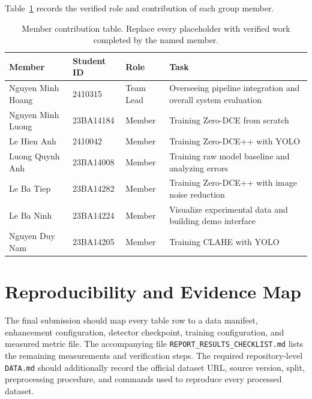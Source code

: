 \documentclass[11pt,a4paper]{article}
\newcommand{\TeamLeadName}{Nguyen Minh Hoang}
\newcommand{\TeamLeadID}{2410315}
\newcommand{\MemberTwoName}{Nguyen Minh Luong}
\newcommand{\MemberTwoID}{23BA14184}
\newcommand{\MemberThreeName}{Le Hien Anh}
\newcommand{\MemberThreeID}{2410042}
\newcommand{\MemberFourName}{Luong Quynh Anh}
\newcommand{\MemberFourID}{23BA14008}
\newcommand{\MemberFiveName}{Le Ba Tiep}
\newcommand{\MemberFiveID}{23BA14282}
\newcommand{\MemberSixName}{Le Ba Ninh}
\newcommand{\MemberSixID}{23BA14224}
\newcommand{\MemberSevenName}{Nguyen Duy Nam}
\newcommand{\MemberSevenID}{23BA14205}
\begin{document}
Table~\ref{tab:member-contributions} records the verified role and contribution
of each group member.

\begin{table}[H]
\centering
\caption{Member contribution table. Replace every placeholder with verified
work completed by the named member.}
\label{tab:member-contributions}
\small
\begin{tabularx}{\textwidth}{lll>{\raggedright\arraybackslash}X}
\toprule
Member & Student ID & Role & Task \\
\midrule
\TeamLeadName & \TeamLeadID & Team Lead & Overseeing pipeline integration and overall system evaluation\\
\MemberTwoName & \MemberTwoID & Member & Training Zero-DCE from scratch \\
\MemberThreeName & \MemberThreeID & Member & Training Zero-DCE++ with YOLO \\
\MemberFourName & \MemberFourID & Member & Training raw model baseline and analyzing errors  \\
\MemberFiveName & \MemberFiveID & Member & Training Zero-DCE++ with image noise reduction  \\
\MemberSixName & \MemberSixID & Member & Visualize experimental data and building demo interface\\
\MemberSevenName & \MemberSevenID & Member & Training CLAHE with YOLO \\

\bottomrule
\end{tabularx}
\end{table}

\section{Reproducibility and Evidence Map}

The final submission should map every table row to a data manifest, enhancement
configuration, detector checkpoint, training configuration, and measured metric
file. The accompanying file \texttt{REPORT\_RESULTS\_CHECKLIST.md} lists the
remaining measurements and verification steps. The required repository-level
\texttt{DATA.md} should additionally record the official dataset URL, source
version, split, preprocessing procedure, and commands used to reproduce every
processed dataset.
\end{document}
